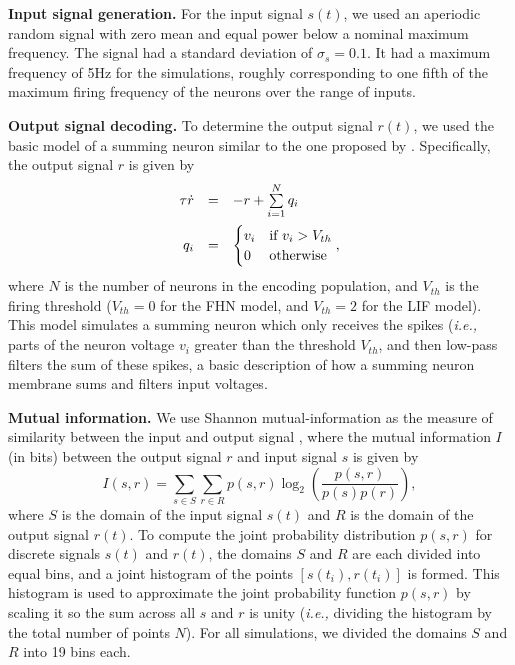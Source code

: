\documentclass[12pt]{article}
\newcommand{\ie}{\emph{i.e., }}
\begin{document}
\textbf{Input signal generation.} For the input signal $s(t)$, we used an aperiodic random signal with zero mean and equal power below a nominal maximum frequency. The signal had a standard deviation of $\sigma_s = 0.1$. It had a maximum frequency of 5Hz for the simulations, roughly corresponding to one fifth of the maximum firing frequency of the neurons over the range of inputs.

\textbf{Output signal decoding.} To determine the output signal $r(t)$, we used the basic model of a summing neuron similar to the one proposed by \cite{Stocks2001}. Specifically, the output signal $r$ is given by
\begin{equation}
  \begin{array}{rcl}
    \tau \dot{r} & = & -r + \sum\limits_{i=1}^N q_i \vspace{0.5em}\\
    q_i & = & \begin{cases} v_i & \text{if } v_i > V_{th} \\ 0 & \text{otherwise} \end{cases},
  \end{array}
\end{equation}
where $N$ is the number of neurons in the encoding population, and $V_{th}$ is the firing threshold ($V_{th} = 0$ for the FHN model, and $V_{th} = 2$ for the LIF model). This model simulates a summing neuron which only receives the spikes (\ie parts of the neuron voltage $v_i$ greater than the threshold $V_{th}$, and then low-pass filters the sum of these spikes, a basic description of how a summing neuron membrane sums and filters input voltages. 

\textbf{Mutual information.} We use Shannon mutual-information as the measure of similarity between the input and output signal \citep{Heneghan1996,Stocks2001}, where the mutual information $I$ (in bits) between the output signal $r$ and input signal $s$ is given by
\begin{equation}
  I(s,r) = \sum\limits_{s \in S} \sum\limits_{r \in R} p(s,r) \log_2\left(\frac{p(s,r)}{p(s)p(r)}\right),
\end{equation}
where $S$ is the domain of the input signal $s(t)$ and $R$ is the domain of the output signal $r(t)$. To compute the joint probability distribution $p(s,r)$ for discrete signals $s(t)$ and $r(t)$, the domains $S$ and $R$ are each divided into equal bins, and a joint histogram of the points $[s(t_i),r(t_i)]$ is formed. This histogram is used to approximate the joint probability function $p(s,r)$ by scaling it so the sum across all $s$ and $r$ is unity (\ie dividing the histogram by the total number of points $N$). For all simulations, we divided the domains $S$ and $R$ into 19 bins each.
\end{document}
